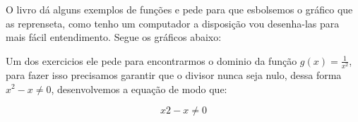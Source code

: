 \documentclass[paper=a4, fontsize=11pt]{scrartcl} %
\numberwithin{equation}{section} %
\numberwithin{figure}{section} %
\numberwithin{table}{section} %
\begin{document}
\clearpage

O livro dá alguns exemplos de funções e pede para que esbolsemos o gráfico que as reprenseta, como tenho um computador a disposição vou desenha-las para mais fácil entendimento. Segue os gráficos abaixo:



Um dos exercicios ele pede para encontrarmos o dominio da função $g(x) = \frac{1}{x^2}$, para fazer isso precisamos garantir que o divisor nunca seja nulo, dessa forma $x^2 -x \ne 0$, desenvolvemos a equação de modo que: 

\begin{equation}
x2-x \ne 0
\end{equation}









\end{document}
